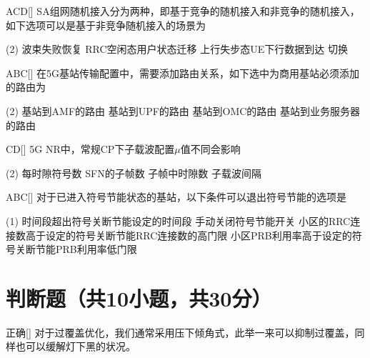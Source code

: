 \begin{choice}{\;ACD\;}[]
    SA组网随机接入分为两种，即基于竞争的随机接入和非竞争的随机接入，如下选项可以是基于非竞争随机接入的场景为
    \begin{tasks}(2)
        \task 波束失败恢复
        \task RRC空闲态用户状态迁移
        \task 上行失步态UE下行数据到达
        \task 切换
    \end{tasks}
\end{choice}

\begin{choice}{\;ABC\;}[]
    在5G基站传输配置中，需要添加路由关系，如下选中为商用基站必须添加的路由为
    \begin{tasks}(2)
        \task 基站到AMF的路由
        \task 基站到UPF的路由
        \task 基站到OMC的路由
        \task 基站到业务服务器的路由
    \end{tasks}
\end{choice}

\begin{choice}{\;CD\;}[]
    5G NR中，常规CP下子载波配置$\mu $值不同会影响
    \begin{tasks}(2)
        \task 每时隙符号数
        \task SFN的子帧数
        \task 子帧中时隙数
        \task 子载波间隔
    \end{tasks}
\end{choice}

\begin{choice}{\;ABC\;}[]
    对于已进入符号节能状态的基站，以下条件可以退出符号节能的选项是
    \begin{tasks}(1)
        \task 时间段超出符号关断节能设定的时间段
        \task 手动关闭符号节能开关
        \task 小区的RRC连接数高于设定的符号关断节能RRC连接数的高门限
        \task 小区PRB利用率高于设定的符号关断节能PRB利用率低门限
    \end{tasks}
\end{choice}




\section{判断题（共10小题，共30分）}

\begin{choice}{\;正确\;}[]
    对于过覆盖优化，我们通常采用压下倾角式，此举一来可以抑制过覆盖，同样也可以缓解灯下黑的状况。
\end{choice}



